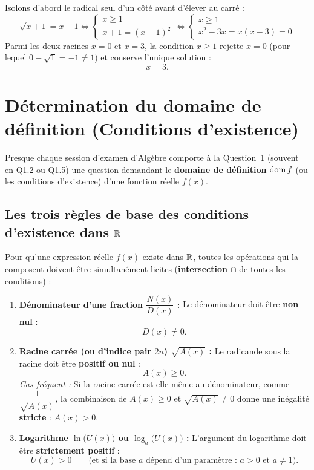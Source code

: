 \begin{exemple}
\begin{enumerate}
    Isolons d'abord le radical seul d'un côté avant d'élever au carré :
    \[
        \sqrt{x + 1} = x - 1 \iff \begin{cases} x \ge 1 \\ x + 1 = (x - 1)^2 \end{cases} \iff \begin{cases} x \ge 1 \\ x^2 - 3x = x(x - 3) = 0 \end{cases}
    \]
    Parmi les deux racines $x = 0$ et $x = 3$, la condition $x \ge 1$ rejette $x = 0$ (pour lequel $0 - \sqrt{1} = -1 \neq 1$) et conserve l'unique solution :
    \[
        \boxed{x = 3}.
    \]
\end{enumerate}
\end{exemple}

\section{Détermination du domaine de définition (Conditions d'existence)}

Presque chaque session d'examen d'Algèbre comporte à la Question~1 (souvent en Q1.2 ou Q1.5) une question demandant le \textbf{domaine de définition} $\operatorname{dom} f$ (ou les conditions d'existence) d'une fonction réelle $f(x)$.

\subsection{Les trois règles de base des conditions d'existence dans $\mathbb{R}$}

\begin{theoreme}
Pour qu'une expression réelle $f(x)$ existe dans $\mathbb{R}$, toutes les opérations qui la composent doivent être simultanément licites (\textbf{intersection $\cap$} de toutes les conditions) :
\begin{enumerate}
    \item \textbf{Dénominateur d'une fraction $\dfrac{N(x)}{D(x)}$ :} Le dénominateur doit être \textbf{non nul} :
    \[
        \boxed{D(x) \neq 0}.
    \]
    \item \textbf{Racine carrée (ou d'indice pair $2n$) $\sqrt{A(x)}$ :} Le radicande sous la racine doit être \textbf{positif ou nul} :
    \[
        \boxed{A(x) \ge 0}.
    \]
    \emph{Cas fréquent :} Si la racine carrée est elle-même au dénominateur, comme $\dfrac{1}{\sqrt{A(x)}}$, la combinaison de $A(x) \ge 0$ et $\sqrt{A(x)} \neq 0$ donne une inégalité \textbf{stricte} : $\boxed{A(x) > 0}$.
    \item \textbf{Logarithme $\ln\bigl(U(x)\bigr)$ ou $\log_a\bigl(U(x)\bigr)$ :} L'argument du logarithme doit être \textbf{strictement positif} :
    \[
        \boxed{U(x) > 0} \qquad \text{(et si la base $a$ dépend d'un paramètre : } a > 0 \text{ et } a \neq 1\text{)}.
    \]
\end{enumerate}
\end{theoreme}

